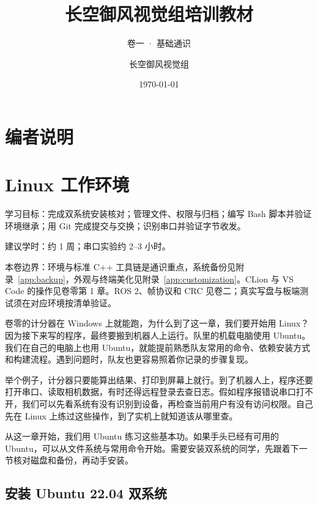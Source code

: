 \documentclass[
  lang=cn,
  scheme=chinese,
  chinesefont=ctexfont,
  11pt,
  oneside,
  device=normal,
  color=cyan,
  mode=fancy
]{../templates/elegantbook}
\title{长空御风视觉组培训教材}
\subtitle{卷一 · 基础通识}
\author{长空御风视觉组}
\institute{视觉组培训}
\date{\today}
\begin{document}
\maketitle

\frontmatter

\chapter*{编者说明}


\tableofcontents

\mainmatter

\chapter{Linux 工作环境}

\begin{introduction}
  \item 学习目标：完成双系统安装核对；管理文件、权限与归档；编写 Bash 脚本并验证环境继承；用 Git 完成提交与交换；识别串口并验证字节收发。
  \item 建议学时：约 1 周；串口实验约 2--3 小时。
  \item 本卷边界：环境与标准 C++ 工具链是通识重点，系统备份见附录~\ref{app:backup}，外观与终端美化见附录~\ref{app:customization}。CLion 与 VS Code 的操作见卷零第 1 章。ROS 2、帧协议和 CRC 见卷二；真实写盘与板端测试须在对应环境按清单验证。
\end{introduction}

卷零的计分器在 Windows 上就能跑，为什么到了这一章，我们要开始用 Linux？因为接下来写的程序，最终要搬到机器人上运行。队里的机载电脑使用 Ubuntu。我们在自己的电脑上也用 Ubuntu，就能提前熟悉队友常用的命令、依赖安装方式和构建流程。遇到问题时，队友也更容易照着你记录的步骤复现。

举个例子，计分器只要能算出结果、打印到屏幕上就行。到了机器人上，程序还要打开串口、读取相机数据，有时还得远程登录去查日志。假如程序报错说串口打不开，我们可以先看系统有没有识别到设备，再检查当前用户有没有访问权限。自己先在 Linux 上练过这些操作，到了实机上就知道该从哪里查。

从这一章开始，我们用 Ubuntu 练习这些基本功。如果手头已经有可用的 Ubuntu，可以从文件系统与常用命令开始。需要安装双系统的同学，先跟着下一节核对磁盘和备份，再动手安装。

\section{安装 Ubuntu 22.04 双系统}

\end{document}
